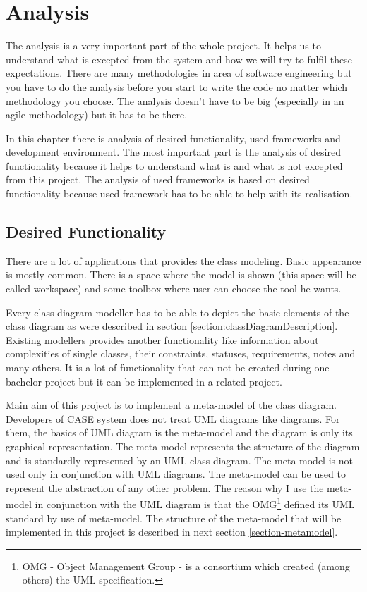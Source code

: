 \chapter{Analysis}

The analysis is a very important part of the whole project. It helps us to understand what is excepted from the system and how we will try to fulfil these expectations. There are many methodologies in area of software engineering but you have to do the analysis before you start to write the code no matter which methodology you choose. The analysis doesn't have to be big (especially in an agile methodology) but it has to be there.

In this chapter there is analysis of desired functionality, used frameworks and development environment. The most important part is the analysis of desired functionality because it helps to understand what is and what is not excepted from this project. The analysis of used frameworks is based on desired functionality because used framework has to be able to help with its realisation.

\section{Desired Functionality}

There are a lot of applications that provides the class modeling. Basic appearance is mostly common. There is a space where the model is shown (this space will be called workspace) and some toolbox where user can choose the tool he wants.

Every class diagram modeller has to be able to depict the basic elements of the class diagram as were described in section \ref{section:classDiagramDescription}. Existing modellers provides another functionality like information about complexities of single classes, their constraints, statuses, requirements, notes and many others. It is a lot of functionality that can not be created during one bachelor project but it can be implemented in a related project.

Main aim of this project is to implement a meta-model of the class diagram. Developers of CASE system does not treat UML diagrams like diagrams. For them, the basics of UML diagram is the meta-model and the diagram is only its graphical representation. The meta-model represents the structure of the diagram and is standardly represented by an UML class diagram. The meta-model is not used only in conjunction with UML diagrams. The meta-model can be used to represent the abstraction of any other problem. The reason why I use the meta-model in conjunction with the UML diagram is that the OMG\footnote{OMG - Object Management Group - is a consortium which created (among others) the UML specification.} defined its UML standard by use of meta-model. The structure of the meta-model that will be implemented in this project is described in next section \ref{section-metamodel}.

